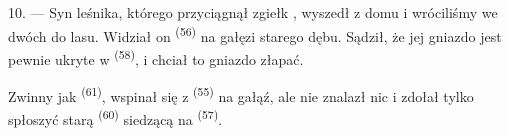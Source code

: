 10. --- Syn leśnika, którego przyciągnął zgiełk , wyszedł z
domu i wróciliśmy we dwóch do lasu. Widział on  \textsuperscript{(56)} na
gałęzi starego dębu. Sądził, że jej gniazdo jest pewnie ukryte w 
\textsuperscript{(58)}, i chciał to gniazdo złapać.

Zwinny jak  \textsuperscript{(61)}, wspinał się z 
\textsuperscript{(55)} na gałąź, ale nie znalazł nic i zdołał tylko spłoszyć starą
 \textsuperscript{(60)} siedzącą na  \textsuperscript{(57)}.
\VUsaut{4.0mm}
\VUfilet{22mm}
